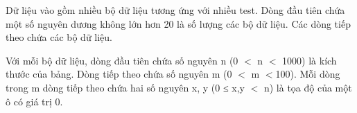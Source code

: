 Dữ liệu vào gồm nhiều bộ dữ liệu tương ứng với nhiều test. Dòng đầu tiên chứa một số nguyên dương không lớn hơn 20 là số lượng các bộ dữ liệu. Các dòng tiếp theo chứa các bộ dữ liệu.  

   Với mỗi bộ dữ liệu, dòng đầu tiên chứa số nguyên n (0 $<$ n $<$ 1000) là kích thước của bảng. Dòng tiếp theo chứa số nguyên m (0 $<$ m $<$100). Mỗi dòng trong m dòng tiếp theo chứa hai số nguyên x, y (0 ≤ x,y $<$ n)  là tọa độ của một ô có giá trị 0.